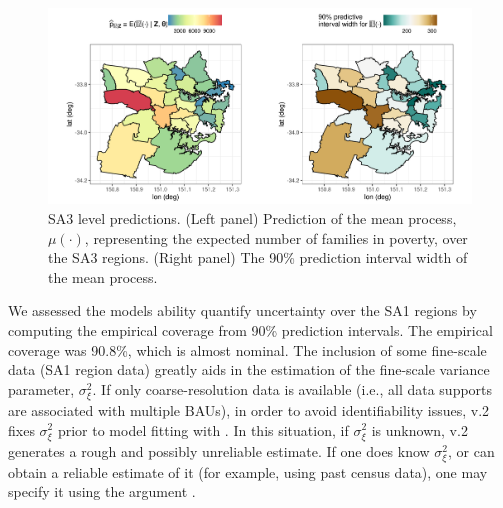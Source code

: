 \documentclass[nojss]{jss}
\begin{document}
\begin{figure}[t!]
    \centering
    \includegraphics[width = \linewidth]{img/Sydney_SA3_predictions.png}
    \caption{SA3 level predictions. (Left panel) Prediction of the mean process, $\mu(\cdot)$, representing the expected number of families in poverty, over the SA3 regions. (Right panel) The 90\% prediction interval width of the mean process.
}   
  \label{fig:SA3_predictions}
\end{figure}


 We assessed the models ability quantify uncertainty over the SA1 regions by computing the empirical coverage from 90\% prediction intervals. 
 The empirical coverage was 90.8\%, which is almost nominal. 
 The inclusion of some fine-scale data (SA1 region data) greatly aids in the estimation of the fine-scale variance parameter, $\sigma^2_\xi$. 
 If only coarse-resolution data is available (i.e., all data supports are associated with multiple BAUs), in order to avoid identifiability issues,  v.2 fixes $\sigma^2_\xi$ prior to model fitting with . 
 In this situation, if $\sigma^2_\xi$ is unknown,  v.2 generates a rough and possibly unreliable estimate. 
 If one does know $\sigma^2_\xi$, or can obtain a reliable estimate of it (for example, using past census data), one may specify it using the argument . 
 
  
\end{document}
